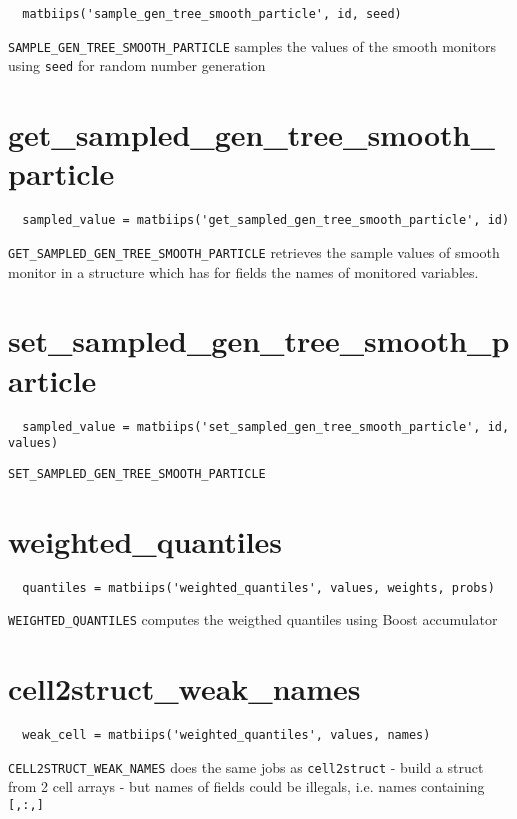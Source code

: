 \documentclass[11pt,twoside]{article}
\begin{document}
 \begin{lstlisting}
  matbiips('sample_gen_tree_smooth_particle', id, seed)
 \end{lstlisting}

 \texttt{SAMPLE\_GEN\_TREE\_SMOOTH\_PARTICLE} samples the values of the smooth monitors using \texttt{seed} for random number generation

\section{get\_sampled\_gen\_tree\_smooth\_particle}
 \begin{lstlisting}
  sampled_value = matbiips('get_sampled_gen_tree_smooth_particle', id)
 \end{lstlisting}

 \texttt{GET\_SAMPLED\_GEN\_TREE\_SMOOTH\_PARTICLE} retrieves the sample values of smooth monitor in a structure which has for fields the names
 of monitored variables.

\section{set\_sampled\_gen\_tree\_smooth\_particle}

 \begin{lstlisting}
  sampled_value = matbiips('set_sampled_gen_tree_smooth_particle', id, values)
 \end{lstlisting}
  \texttt{SET\_SAMPLED\_GEN\_TREE\_SMOOTH\_PARTICLE}
\section{weighted\_quantiles}

 \begin{lstlisting}
  quantiles = matbiips('weighted_quantiles', values, weights, probs)
 \end{lstlisting}

 \texttt{WEIGHTED\_QUANTILES} computes the weigthed quantiles using Boost accumulator


\section{cell2struct\_weak\_names}

 \begin{lstlisting}
  weak_cell = matbiips('weighted_quantiles', values, names)
 \end{lstlisting}

  \texttt{CELL2STRUCT\_WEAK\_NAMES} does the same jobs as \texttt{cell2struct} - build a struct from 2 cell arrays - but names of fields could be
  illegals, i.e.  names containing \texttt{[,:,]}
\end{document}
